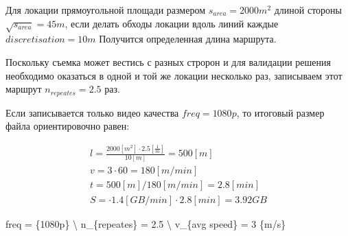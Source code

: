 Для локации прямоугольной площади размером \(s_{area} = 2000 m^2\)
длиной стороны \(\sqrt{s_{area}} = 45 m\), если делать обходы локации
вдоль линий каждые \({discretisation} = 10 m\) Получится определенная
длина маршрута.

Поскольку съемка может вестись с разных стророн и для валидации решения
необходимо оказаться в одной и той же локации несколько раз, записываем
этот маршрут \(n_{repeates} = 2.5\) раз.

Если записывается только видео качества \(freq = {1080p}\), то итоговый
размер файла ориентировочно равен:

\begin{align}
l = \frac{2000 [m^2] \cdot 2.5[{\frac{1}{m}}]}{10 [{m}]} = 500[m] \\
v = 3 \cdot 60 = 180[m/min] \\
t =  500[m] / 180[m/min] = 2.8 [min] \\
S = \cdot 1.4 [GB / min] \cdot 2.8 [min] = 3.92 GB
\end{align}

freq = \{1080p\} \textbackslash{} n\_\{repeates\} = 2.5 \textbackslash{}
v\_\{avg speed\} = 3 \{m/s\}
